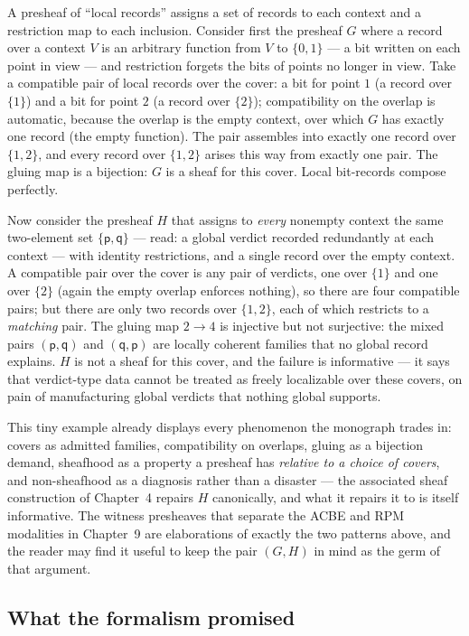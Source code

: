 A presheaf of ``local records'' assigns a set of records to each context
and a restriction map to each inclusion. Consider first the presheaf $G$
where a record over a context $V$ is an arbitrary function from $V$ to
$\{0,1\}$ --- a bit written on each point in view --- and restriction
forgets the bits of points no longer in view. Take a compatible pair of
local records over the cover: a bit for point $1$ (a record over $\{1\}$)
and a bit for point $2$ (a record over $\{2\}$); compatibility on the
overlap is automatic, because the overlap is the empty context, over which
$G$ has exactly one record (the empty function). The pair assembles into
exactly one record over $\{1,2\}$, and every record over $\{1,2\}$ arises
this way from exactly one pair. The gluing map is a bijection: $G$ is a
sheaf for this cover. Local bit-records compose perfectly.

Now consider the presheaf $H$ that assigns to \emph{every} nonempty
context the same two-element set $\{\mathsf{p}, \mathsf{q}\}$ --- read: a
global verdict recorded redundantly at each context --- with identity
restrictions, and a single record over the empty context. A compatible
pair over the cover is any pair of verdicts, one over $\{1\}$ and one over
$\{2\}$ (again the empty overlap enforces nothing), so there are four
compatible pairs; but there are only two records over $\{1,2\}$, each of
which restricts to a \emph{matching} pair. The gluing map $2 \to 4$ is
injective but not surjective: the mixed pairs $(\mathsf{p}, \mathsf{q})$
and $(\mathsf{q}, \mathsf{p})$ are locally coherent families that no
global record explains. $H$ is not a sheaf for this cover, and the failure
is informative --- it says that verdict-type data cannot be treated as
freely localizable over these covers, on pain of manufacturing global
verdicts that nothing global supports.

This tiny example already displays every phenomenon the monograph trades
in: covers as admitted families, compatibility on overlaps, gluing as a
bijection demand, sheafhood as a property a presheaf has \emph{relative to
a choice of covers}, and non-sheafhood as a diagnosis rather than a
disaster --- the associated sheaf construction of Chapter~4 repairs $H$
canonically, and what it repairs it to is itself informative. The witness
presheaves that separate the ACBE and RPM modalities in Chapter~9 are
elaborations of exactly the two patterns above, and the reader may find it
useful to keep the pair $(G, H)$ in mind as the germ of that argument.

\subsection{What the formalism promised}\label{ch01:sec:promise}

